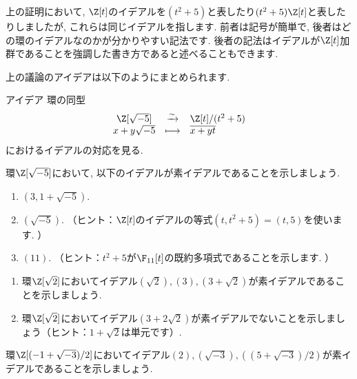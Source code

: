 \documentclass[11pt,b5paper,oneside,titlepage,lualatex]{ltjsreport}
\begin{document}
\begin{rem}{}{}
	上の証明において, $ \Z[t] $のイデアルを$ (t^2 + 5) $と表したり$ (t^2 + 5) \Z[t] $と表したりしましたが, これらは同じイデアルを指します. 
	前者は記号が簡単で, 後者はどの環のイデアルなのかが分かりやすい記法です. 
	後者の記法はイデアルが$ \Z[t] $加群であることを強調した書き方であると述べることもできます. 
\end{rem}

上の議論のアイデアは以下のようにまとめられます. 

\begin{simplebox}{アイデア}
	環の同型
	\[
	\begin{array}{ccl}
		\Z[\sqrt{-5}] & \xrightarrow{\sim} & \Z[t]/(t^2 + 5) \\
		x + y\sqrt{-5} & \longmapsto & \overline{x + yt}
	\end{array}
	\]
	におけるイデアルの対応を見る. 
\end{simplebox}

\begin{exc}{}{}
	環$ \Z[\sqrt{-5}] $において, 以下のイデアルが素イデアルであることを示しましょう. 
	\begin{enumerate}
		\item $ (3, 1 + \sqrt{-5}) $.
		\item $ (\sqrt{-5}) $. （ヒント：$ \Z[t] $のイデアルの等式$ (t, t^2+5) = (t, 5) $を使います. ）
		\item $ (11) $. （ヒント：$ t^2+5 $が$ \F_{11}[t] $の既約多項式であることを示します. ）
	\end{enumerate}
\end{exc}

\begin{exc}{}{}
	\begin{enumerate}
		\item 環$ \Z[\sqrt{2}] $においてイデアル$ (\sqrt{2}), (3), (3+\sqrt{2}) $が素イデアルであることを示しましょう. 
		\item 環$ \Z[\sqrt{2}] $においてイデアル$ (3+2\sqrt{2}) $が素イデアルでないことを示しましょう（ヒント：$ 1 + \sqrt{2} $は単元です）. 
	\end{enumerate}
\end{exc}

\begin{exc}{}{}
	環$ \Z[(-1 + \sqrt{-3})/2] $においてイデアル$ (2), (\sqrt{-3}), ((5 + \sqrt{-3})/2) $が素イデアルであることを示しましょう. 
\end{exc}

\end{document}
